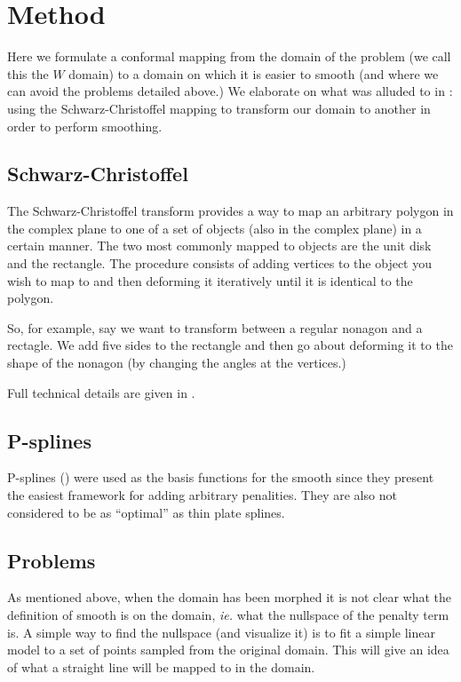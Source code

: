 \documentclass[a4paper,10pt]{amsart}
\newcommand{\sch}{Schwarz-Christoffel }
\begin{document}
\section{Method}

Here we formulate a conformal mapping from the domain of the problem (we call this the $W$ domain) to a domain on which it is easier to smooth (and where we can avoid the problems detailed above.) We elaborate on what was alluded to in \cite{eilerstalk}: using the \sch mapping to transform our domain to another in order to perform smoothing.

\subsection{\sch}

The \sch transform provides a way to map an arbitrary polygon in the complex plane to one of a set of objects (also in the complex plane) in a certain manner. The two most commonly mapped to objects are the unit disk and the rectangle. The procedure consists of adding vertices to the object you wish to map to and then deforming it iteratively until it is identical to the polygon.

So, for example, say we want to transform between a regular nonagon and a rectagle. We add five sides to the rectangle and then go about deforming it to the shape of the nonagon (by changing the angles at the vertices.) 

Full technical details are given in \cite{miller08}.


\subsection{P-splines}
P-splines (\cite{eilersmarx96}) were used as the basis functions for the smooth since they present the easiest framework for adding arbitrary penalities. They are also not considered to be as ``optimal'' as thin plate splines.


\subsection{Problems}

As mentioned above, when the domain has been morphed it is not clear what the definition of smooth is on the domain, \emph{ie.} what the nullspace of the penalty term is. A simple way to find the nullspace (and visualize it) is to fit a simple linear model to a set of points sampled from the original domain. This will give an idea of what a straight line will be mapped to in the domain.
\end{document}
